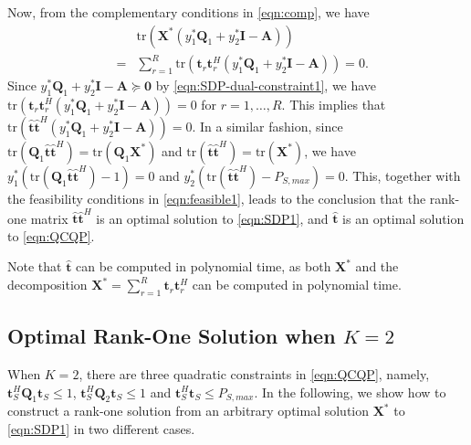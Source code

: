 \documentclass[twocolumn,10pt]{IEEEtran}
\theoremstyle{plain} \newtheorem{theorem}{Theorem}
\theoremstyle{plain} \newtheorem{proposition}{Proposition}
\theoremstyle{plain} \newtheorem{corollary}{Corollary}
\theoremstyle{remark} \newtheorem{remark}{Remark}
\theoremstyle{remark} \newtheorem{lemma}{Lemma}
\theoremstyle{plain} \newtheorem{definition}{Definition}
\theoremstyle{plain} \newtheorem{assumption}{Assumption}
\theoremstyle{plain} \newtheorem{fact}{Fact}
\begin{document}
Now, from the complementary conditions in \eqref{eqn:comp}, we have
\begin{eqnarray*}
 &&\mathrm{tr}\left(\mathbf{X}^*\left(y_1^*\mathbf{Q}_1+y_2^*\mathbf{I}-\mathbf{A}\right)\right) \\
 &=& \sum_{r=1}^R\mathrm{tr}\left(\mathbf{t}_r\mathbf{t}_r^H\left( y_1^*\mathbf{Q}_1+y_2^*\mathbf{I}-\mathbf{A} \right)\right) = 0. 
 \end{eqnarray*}
Since $y_1^*\mathbf{Q}_1+y_2^*\mathbf{I}-\mathbf{A} \succeq \mathbf{0}$ by \eqref{eqn:SDP-dual-constraint1}, we have $\mathrm{tr}\left(\mathbf{t}_r\mathbf{t}_r^H\left(y_1^*\mathbf{Q}_1+y_2^*\mathbf{I}-\mathbf{A}\right)\right)=0$ for $r=1,\ldots,R$.  This implies that $\mathrm{tr}\left(\mathbf{\hat{t}}\mathbf{\hat{t}}^H\left(y_1^*\mathbf{Q}_1+y_2^*\mathbf{I}-\mathbf{A}\right)\right)=0$.  In a similar fashion, since $\mathrm{tr}(\mathbf{Q}_1\mathbf{\hat{t}}\mathbf{\hat{t}}^H)=\mathrm{tr}(\mathbf{Q}_1\mathbf{X^*})$ and $\mathrm{tr}(\mathbf{\hat{t}}\mathbf{\hat{t}}^H)=\mathrm{tr}(\mathbf{X^*})$, we have $y_1^*\left(\mathrm{tr}(\mathbf{Q}_1\mathbf{\hat{t}}\mathbf{\hat{t}}^H)-1\right)=0$ and $y_2^*\left(\mathrm{tr}(\mathbf{\hat{t}}\mathbf{\hat{t}}^H)-P_{S,max}\right)=0$.  This, together with the feasibility conditions in \eqref{eqn:feasible1}, leads to the conclusion that the rank-one matrix $\mathbf{\hat{t}}\mathbf{\hat{t}}^H$ is an optimal solution to \eqref{eqn:SDP1}, and $\mathbf{\hat{t}}$ is an optimal solution to \eqref{eqn:QCQP}.

Note that $\mathbf{\hat{t}}$ can be computed in polynomial time, as both $\mathbf{X}^*$ and the decomposition $\mathbf{X^*}=\sum_{r=1}^R\mathbf{t}_r\mathbf{t}_r^H$ can be computed in polynomial time.

\subsection{Optimal Rank-One Solution when $K=2$}\label{subsection:4-2}
When $K=2$, there are three quadratic constraints in \eqref{eqn:QCQP}, namely, $\mathbf{t}_S^H\mathbf{Q}_1\mathbf{t}_S \leq 1$, $\mathbf{t}_S^H\mathbf{Q}_2\mathbf{t}_S \leq 1$ and $\mathbf{t}_S^H\mathbf{t}_S \leq P_{S,max}$. In the following, we show how to construct a rank-one solution from an arbitrary optimal solution $\mathbf{X}^*$ to \eqref{eqn:SDP1} in two different cases.
\end{document}
